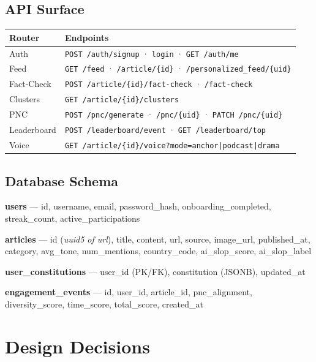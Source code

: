 \documentclass[9pt,a4paper,twocolumn]{article}
\begin{document}
\subsection{API Surface}

\begin{center}
\small
\begin{tabularx}{\columnwidth}{@{}lX@{}}
\toprule
\textbf{Router} & \textbf{Endpoints} \\
\midrule
Auth        & \texttt{POST /auth/signup} · \texttt{login} · \texttt{GET /auth/me} \\
Feed        & \texttt{GET /feed} · \texttt{/article/\{id\}} · \texttt{/personalized\_feed/\{uid\}} \\
Fact-Check  & \texttt{POST /article/\{id\}/fact-check} · \texttt{/fact-check} \\
Clusters    & \texttt{GET /article/\{id\}/clusters} \\
PNC         & \texttt{POST /pnc/generate} · \texttt{/pnc/\{uid\}} · \texttt{PATCH /pnc/\{uid\}} \\
Leaderboard & \texttt{POST /leaderboard/event} · \texttt{GET /leaderboard/top} \\
Voice       & \texttt{GET /article/\{id\}/voice?mode=anchor|podcast|drama} \\
\bottomrule
\end{tabularx}
\end{center}

\subsection{Database Schema}

\textbf{users} — id, username, email, password\_hash, onboarding\_completed, streak\_count, active\_participations

\textbf{articles} — id (\textit{uuid5 of url}), title, content, url, source, image\_url, published\_at, category, avg\_tone, num\_mentions, country\_code, ai\_slop\_score, ai\_slop\_label

\textbf{user\_constitutions} — user\_id (PK/FK), constitution (JSONB), updated\_at

\textbf{engagement\_events} — id, user\_id, article\_id, pnc\_alignment, diversity\_score, time\_score, total\_score, created\_at

\section{Design Decisions}
\end{document}
